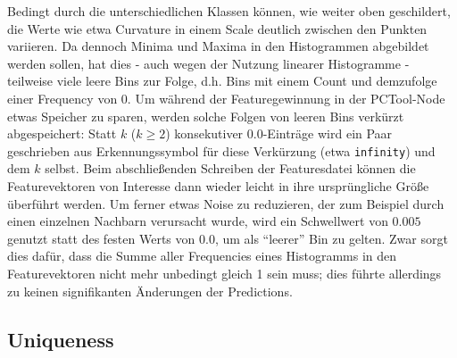 Bedingt durch die unterschiedlichen Klassen können, wie weiter oben geschildert, die Werte wie etwa Curvature in einem Scale deutlich zwischen den Punkten variieren. Da dennoch Minima und Maxima in den Histogrammen abgebildet werden sollen, hat dies - auch wegen der Nutzung linearer Histogramme - teilweise viele leere Bins zur Folge, d.h. Bins mit einem Count und demzufolge einer Frequency von 0. Um während der Featuregewinnung in der PCTool-Node etwas Speicher zu sparen, werden solche Folgen von leeren Bins verkürzt abgespeichert: Statt $k$ ($k \geq 2$) konsekutiver $0.0$-Einträge wird ein Paar geschrieben aus Erkennungssymbol für diese Verkürzung (etwa \texttt{infinity}) und dem $k$ selbst. Beim abschließenden Schreiben der Featuresdatei können die Featurevektoren von Interesse dann wieder leicht in ihre ursprüngliche Größe überführt werden. Um ferner etwas Noise zu reduzieren, der zum Beispiel durch einen einzelnen Nachbarn verursacht wurde, wird ein Schwellwert von $0.005$ genutzt statt des festen Werts von $0.0$, um als ``leerer'' Bin zu gelten. Zwar sorgt dies dafür, dass die Summe aller Frequencies eines Histogramms in den Featurevektoren nicht mehr unbedingt gleich 1 sein muss; dies führte allerdings zu keinen signifikanten Änderungen der Predictions.

\subsection{Uniqueness} 

